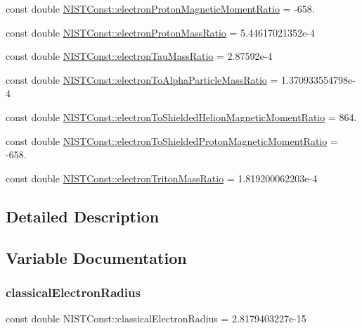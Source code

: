 \begin{DoxyCompactItemize}
\item 
const double \mbox{\hyperlink{group___n_i_s_t_const-_electron_ga8ea70b9b79c3f8b4f9825c48d1758f44}{N\+I\+S\+T\+Const\+::electron\+Proton\+Magnetic\+Moment\+Ratio}} = -\/658.
\item 
const double \mbox{\hyperlink{group___n_i_s_t_const-_electron_gabbaa23094e18f2b83e6145adaebbb6e7}{N\+I\+S\+T\+Const\+::electron\+Proton\+Mass\+Ratio}} = 5.\+44617021352e-\/4
\item 
const double \mbox{\hyperlink{group___n_i_s_t_const-_electron_ga513e30853388cdd091c192dfb6371fa8}{N\+I\+S\+T\+Const\+::electron\+Tau\+Mass\+Ratio}} = 2.\+87592e-\/4
\item 
const double \mbox{\hyperlink{group___n_i_s_t_const-_electron_ga1090a3f764cafde391a3dfe7f459a94d}{N\+I\+S\+T\+Const\+::electron\+To\+Alpha\+Particle\+Mass\+Ratio}} = 1.\+370933554798e-\/4
\item 
const double \mbox{\hyperlink{group___n_i_s_t_const-_electron_gaff98723ab3ee4e1be57a04f2a0f6034d}{N\+I\+S\+T\+Const\+::electron\+To\+Shielded\+Helion\+Magnetic\+Moment\+Ratio}} = 864.
\item 
const double \mbox{\hyperlink{group___n_i_s_t_const-_electron_gacf35e7562c94178f6b182cff46131b6d}{N\+I\+S\+T\+Const\+::electron\+To\+Shielded\+Proton\+Magnetic\+Moment\+Ratio}} = -\/658.
\item 
const double \mbox{\hyperlink{group___n_i_s_t_const-_electron_gac9bfee1055b6fd5d3dabb3126318b52e}{N\+I\+S\+T\+Const\+::electron\+Triton\+Mass\+Ratio}} = 1.\+819200062203e-\/4
\end{DoxyCompactItemize}


\subsection{Detailed Description}


\subsection{Variable Documentation}
\mbox{\label{group___n_i_s_t_const-_electron_gac67d6a01d8d75cb66290a36f7123942b}} 
\subsubsection{\texorpdfstring{classical\+Electron\+Radius}{classicalElectronRadius}}
{\footnotesize\ttfamily const double N\+I\+S\+T\+Const\+::classical\+Electron\+Radius = 2.\+8179403227e-\/15}

